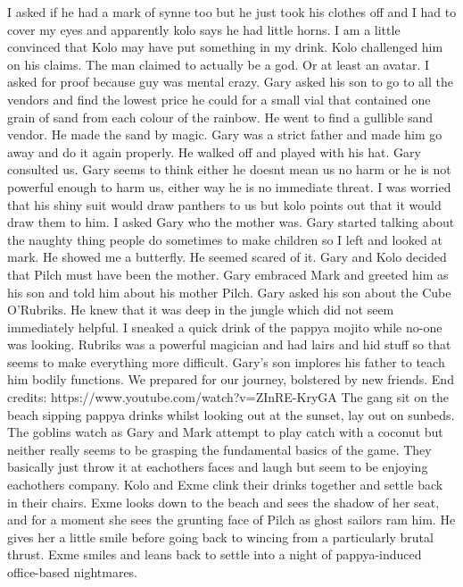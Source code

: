 I asked if he had a mark of synne too but he just took his clothes off and I had to cover my eyes and apparently kolo says he had little horns. I am a little convinced that Kolo may have put something in my drink. Kolo challenged him on his claims. The man claimed to actually be a god. Or at least an avatar. I asked for proof because guy was mental crazy. Gary asked his son to go to all the vendors and find the lowest price he could for a small vial that contained one grain of sand from each colour of the rainbow. He went to find a gullible sand vendor. He made the sand by magic. Gary was a strict father and made him go away and do it again properly. He walked off and played with his hat. Gary consulted us. Gary seems to think either he doesnt mean us no harm or he is not powerful enough to harm us, either way he is no immediate threat. I was worried that his shiny suit would draw panthers to us but kolo points out that it would draw them to him. I asked Gary who the mother was. Gary started talking about the naughty thing people do sometimes to make children so I left and looked at mark. He showed me a butterfly. He seemed scared of it. Gary and Kolo decided that Pilch must have been the mother. Gary embraced Mark and greeted him as his son and told him about his mother Pilch. Gary asked his son about the Cube O’Rubriks. He knew that it was deep in the jungle which did not seem immediately helpful. I sneaked a quick drink of the pappya mojito while no-one was looking. Rubriks was a powerful magician and had lairs and hid stuff so that seems to make everything more difficult. Gary’s son implores his father to teach him bodily functions. We prepared for our journey, bolstered by new friends. End credits: https://www.youtube.com/watch?v=ZInRE-KryGA The gang sit on the beach sipping pappya drinks whilst looking out at the sunset, lay out on sunbeds. The goblins watch as Gary and Mark attempt to play catch with a coconut but neither really seems to be grasping the fundamental basics of the game. They basically just throw it at eachothers faces and laugh but seem to be enjoying eachothers company. Kolo and Exme clink their drinks together and settle back in their chairs. Exme looks down to the beach and sees the shadow of her seat, and for a moment she sees the grunting face of Pilch as ghost sailors ram him. He gives her a little smile before going back to wincing from a particularly brutal thrust. Exme smiles and leans back to settle into a night of pappya-induced office-based nightmares.